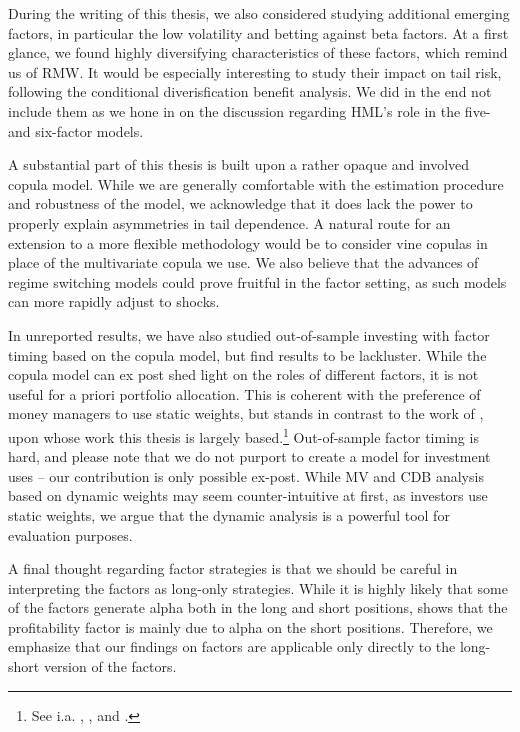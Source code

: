 During the writing of this thesis, we also considered studying additional emerging factors, in particular the low volatility and betting against beta factors. At a first glance, we found highly diversifying characteristics of these factors, which remind us of RMW. It would be especially interesting to study their impact on tail risk, following the conditional diverisfication benefit analysis. We did in the end not include them as we hone in on the discussion regarding HML's role in the five- and six-factor models.

A substantial part of this thesis is built upon a rather opaque and involved copula model. While we are generally comfortable with the estimation procedure and robustness of the model, we acknowledge that it does lack the power to properly explain asymmetries in tail dependence. A natural route for an extension to a more flexible methodology would be to consider vine copulas in place of the multivariate copula we use. We also believe that the advances of regime switching models could prove fruitful in the factor setting, as such models can more rapidly adjust to shocks.

In unreported results, we have also studied out-of-sample investing with factor timing based on the copula model, but find results to be lackluster. While the copula model can ex post shed light on the roles of different factors, it is not useful for a priori portfolio allocation. This is coherent with the preference of money managers to use static weights, but stands in contrast to the work of \textcite{ChristoffersenLanglois2013}, upon whose work this thesis is largely based.\footnote{See i.a. \textcite{AQRSiren}, \textcite{BlackRock}, \textcite{MSCI} and \textcite{Robeco}.} Out-of-sample factor timing is hard, and please note that we do not purport to create a model for investment uses -- our contribution is only possible ex-post. While MV and CDB analysis based on dynamic weights may seem counter-intuitive at first, as investors use static weights, we argue that the dynamic analysis is a powerful tool for evaluation purposes.

A final thought regarding factor strategies is that we should be careful in interpreting the factors as long-only strategies. While it is highly likely that some of the factors generate alpha both in the long and short positions, \textcite{Wang2013} shows that the profitability factor is mainly due to alpha on the short positions. Therefore, we emphasize that our findings on factors are applicable only directly to the long-short version of the factors.